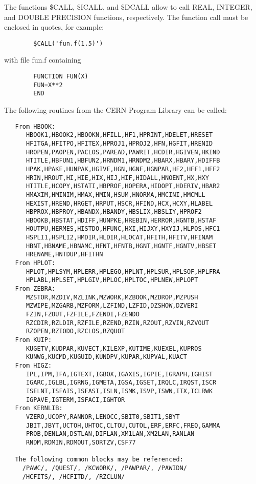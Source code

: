    \par
The functions \$CALL, \$ICALL, and \$DCALL allow to call REAL, INTEGER, and 
   DOUBLE PRECISION functions, respectively.  The function call must be 
   enclosed in quotes, for example:  
\begin{verbatim}
        $CALL('fun.f(1.5)')
\end{verbatim}
   \par
with file fun.f containing 
\begin{verbatim}
        FUNCTION FUN(X)
        FUN=X**2
        END
\end{verbatim}
\ENDVERB
   \par
The following routines from the CERN Program Library can be called:  

\begin{verbatim}
   From HBOOK:
      HBOOK1,HBOOK2,HBOOKN,HFILL,HF1,HPRINT,HDELET,HRESET
      HFITGA,HFITPO,HFITEX,HPROJ1,HPROJ2,HFN,HGFIT,HRENID
      HROPEN,PAOPEN,PACLOS,PAREAD,PAWRIT,HCDIR,HGIVEN,HKIND
      HTITLE,HBFUN1,HBFUN2,HRNDM1,HRNDM2,HBARX,HBARY,HDIFFB
      HPAK,HPAKE,HUNPAK,HGIVE,HGN,HGNF,HGNPAR,HF2,HFF1,HFF2
      HRIN,HROUT,HI,HIE,HIX,HIJ,HIF,HIDALL,HNOENT,HX,HXY
      HTITLE,HCOPY,HSTATI,HBPROF,HOPERA,HIDOPT,HDERIV,HBAR2
      HMAXIM,HMINIM,HMAX,HMIN,HSUM,HNORMA,HMCINI,HMCMLL
      HEXIST,HREND,HRGET,HRPUT,HSCR,HFIND,HCX,HCXY,HLABEL
      HBPROX,HBPROY,HBANDX,HBANDY,HBSLIX,HBSLIY,HPROF2
      HBOOKB,HBSTAT,HDIFF,HUNPKE,HREBIN,HERROR,HGNTB,HSTAF
      HOUTPU,HERMES,HISTDO,HFUNC,HXI,HIJXY,HXYIJ,HLPOS,HFC1
      HSPLI1,HSPLI2,HMDIR,HLDIR,HLOCAT,HFITH,HFITV,HFINAM
      HBNT,HBNAME,HBNAMC,HFNT,HFNTB,HGNT,HGNTF,HGNTV,HBSET
      HRENAME,HNTDUP,HFITHN
   From HPLOT:
      HPLOT,HPLSYM,HPLERR,HPLEGO,HPLNT,HPLSUR,HPLSOF,HPLFRA
      HPLABL,HPLSET,HPLGIV,HPLOC,HPLTOC,HPLNEW,HPLOPT
   From ZEBRA:
      MZSTOR,MZDIV,MZLINK,MZWORK,MZBOOK,MZDROP,MZPUSH
      MZWIPE,MZGARB,MZFORM,LZFIND,LZFID,DZSHOW,DZVERI
      FZIN,FZOUT,FZFILE,FZENDI,FZENDO
      RZCDIR,RZLDIR,RZFILE,RZEND,RZIN,RZOUT,RZVIN,RZVOUT
      RZOPEN,RZIODO,RZCLOS,RZQUOT
   From KUIP:
      KUGETV,KUDPAR,KUVECT,KILEXP,KUTIME,KUEXEL,KUPROS
      KUNWG,KUCMD,KUGUID,KUNDPV,KUPAR,KUPVAL,KUACT
   From HIGZ:
      IPL,IPM,IFA,IGTEXT,IGBOX,IGAXIS,IGPIE,IGRAPH,IGHIST
      IGARC,IGLBL,IGRNG,IGMETA,IGSA,IGSET,IRQLC,IRQST,ISCR
      ISELNT,ISFAIS,ISFASI,ISLN,ISMK,ISVP,ISWN,ITX,ICLRWK
      IGPAVE,IGTERM,ISFACI,IGHTOR
   From KERNLIB:
      VZERO,UCOPY,RANNOR,LENOCC,SBIT0,SBIT1,SBYT
      JBIT,JBYT,UCTOH,UHTOC,CLTOU,CUTOL,ERF,ERFC,FREQ,GAMMA
      PROB,DENLAN,DSTLAN,DIFLAN,XM1LAN,XM2LAN,RANLAN
      RNDM,RDMIN,RDMOUT,SORTZV,CSF77

   The following common blocks may be referenced:
     /PAWC/, /QUEST/, /KCWORK/, /PAWPAR/, /PAWIDN/
     /HCFITS/, /HCFITD/, /RZCLUN/
\end{verbatim}
\ENDCMD

